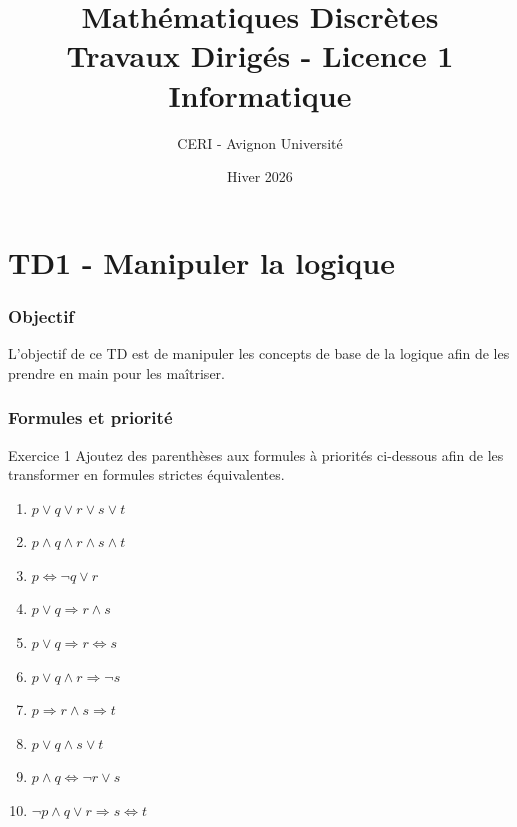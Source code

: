 \documentclass[a4paper,11pt]{article}
\title{\textbf{Mathématiques Discrètes} \\ 
\large Travaux Dirigés - Licence 1 Informatique}
\author{CERI - Avignon Université}
\date{Hiver 2026}
\begin{document}
\maketitle
\thispagestyle{empty}

\newpage
\tableofcontents
\newpage


\part{TD1 - Manipuler la logique}

\section*{Objectif}
L'objectif de ce TD est de manipuler les concepts de base de la logique afin de les prendre en main pour les maîtriser.

\section{Formules et priorité}

\begin{exercisebox}{Exercice 1}
Ajoutez des parenthèses aux formules à priorités ci-dessous afin de les transformer en formules strictes équivalentes.

\begin{enumerate}
    \item $p \vee q \vee r \vee s \vee t$
    \item $p \wedge q \wedge r \wedge s \wedge t$
    \item $p \Leftrightarrow \neg q \vee r$
    \item $p \vee q \Rightarrow r \wedge s$
    \item $p \vee q \Rightarrow r \Leftrightarrow s$
    \item $p \vee q \wedge r \Rightarrow \neg s$
    \item $p \Rightarrow r \wedge s \Rightarrow t$
    \item $p \vee q \wedge s \vee t$
    \item $p \wedge q \Leftrightarrow \neg r \vee s$
    \item $\neg p \wedge q \vee r \Rightarrow s \Leftrightarrow t$
\end{enumerate}
\end{exercisebox}
\end{document}
